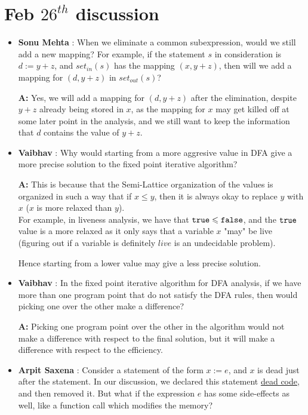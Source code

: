 \clearpage
\section{Feb $26^{th}$ discussion}

\begin{itemize}
    \item \textbf{Sonu Mehta} : When we eliminate a common subexpression, would we still add a new mapping?
        For example, if the statement $s$ in consideration is $d := y + z$, and $set_{in}(s)$ has the mapping $(x, y+z)$, then will we add a mapping for $(d,y+z)$ in $set_{out}(s)$?

        \textbf{A:} Yes, we will add a mapping for $(d,y+z)$ after the elimination, despite $y+z$ already being stored in $x$, as the mapping for $x$ may get killed off at some later point in the analysis, and we still want to keep the information that $d$ contains the value of $y+z$.
    \item \textbf{Vaibhav} : Why would starting from a more aggresive value in DFA give a more precise solution to the fixed point iterative algorithm?
    
        \textbf{A:} This is because that the Semi-Lattice organization of the values is organized in such a way that if $x \leq y$, then it is always okay to replace $y$ with $x$ ($x$ is more relaxed than $y$).\\
                    For example, in liveness analysis, we have that ${\tt true} \leqslant {\tt false}$, and the ${\tt true}$ value is a more relaxed as it only says that a variable $x$ "may" be live (figuring out if a variable is definitely $live$ is an undecidable problem).

                    Hence starting from a lower value may give a less precise solution.

    \item \textbf{Vaibhav} : In the fixed point iterative algorithm for DFA analysis, if we have more than one program point that do not satisfy the DFA rules, then would picking one over the other make a difference?
    
        \textbf{A:} Picking one program point over the other in the algorithm would not make a difference with respect to the final solution, but it will make a difference with respect to the efficiency.

    \item \textbf{Arpit Saxena} : Consider a statement of the form $x := e$, and $x$ is dead just after the statement. In our discussion, we declared this statement \underline{dead code}, and then removed it. But what if the expression $e$ has some side-effects as well, like a function call which modifies the memory?
    

\end{itemize}
